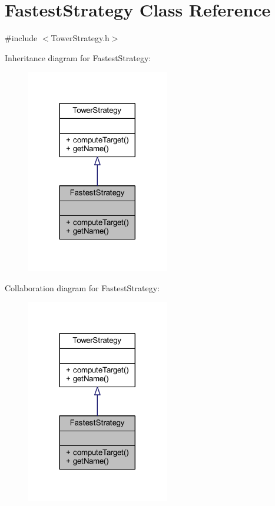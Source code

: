 \hypertarget{class_fastest_strategy}{\section{Fastest\+Strategy Class Reference}
\label{class_fastest_strategy}
}


{\ttfamily \#include $<$Tower\+Strategy.\+h$>$}



Inheritance diagram for Fastest\+Strategy\+:
\nopagebreak
\begin{figure}[H]
\begin{center}
\leavevmode
\includegraphics[width=176pt]{class_fastest_strategy__inherit__graph}
\end{center}
\end{figure}


Collaboration diagram for Fastest\+Strategy\+:
\nopagebreak
\begin{figure}[H]
\begin{center}
\leavevmode
\includegraphics[width=176pt]{class_fastest_strategy__coll__graph}
\end{center}
\end{figure}

